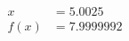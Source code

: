 \documentclass[preview]{standalone}
\begin{document}
\begin{align*}
x &= 5.0025\\f(x) &= 7.9999992
\end{align*}
\end{document}
